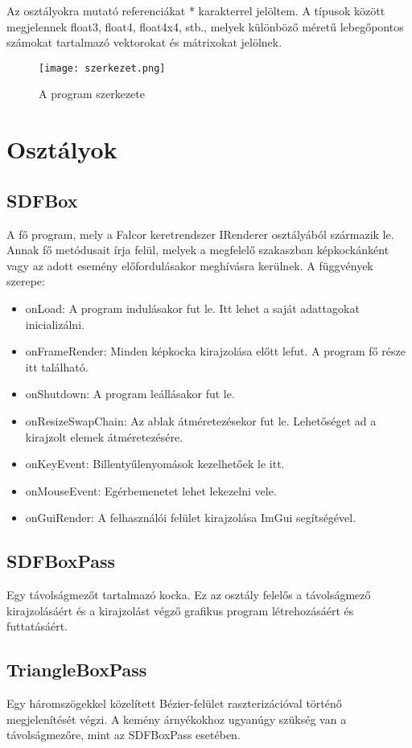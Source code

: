 Az osztályokra mutató referenciákat * karakterrel jelöltem. A típusok között megjelennek float3, float4, float4x4, stb., melyek különböző méretű lebegőpontos számokat tartalmazó vektorokat és mátrixokat jelölnek.

\begin{figure}
	\centering
	\texttt{[image: szerkezet.png]}
	\caption{A program szerkezete}
	\label{fig:szerkezet}
\end{figure}


\section{Osztályok}

\subsection{SDFBox}
A fő program, mely a Falcor keretrendszer IRenderer osztályából származik le. Annak fő metódusait írja felül, melyek a megfelelő szakaszban képkockánként vagy az adott esemény előfordulásakor meghívásra kerülnek. A függvények szerepe:
\begin{itemize}
	\item onLoad: A program indulásakor fut le. Itt lehet a saját adattagokat inicializálni.
	\item onFrameRender: Minden képkocka kirajzolása előtt lefut. A program fő része itt található.
	\item onShutdown: A program leállásakor fut le.
	\item onResizeSwapChain: Az ablak átméretezésekor fut le. Lehetőséget ad a kirajzolt elemek átméretezésére.
	\item onKeyEvent: Billentyűlenyomások kezelhetőek le itt.
	\item onMouseEvent: Egérbemenetet lehet lekezelni vele.
	\item onGuiRender: A felhasználói felület kirajzolása ImGui segítségével.
\end{itemize}

\subsection{SDFBoxPass}
Egy távolságmezőt tartalmazó kocka. Ez az osztály felelős a távolságmező kirajzolásáért és a kirajzolást végző grafikus program létrehozásáért és futtatásáért.

\subsection{TriangleBoxPass}
Egy háromszögekkel közelített Bézier-felület raszterizációval történő megjelenítését végzi. A kemény árnyékokhoz ugyanúgy szükség van a távolságmezőre, mint az SDFBoxPass esetében.

